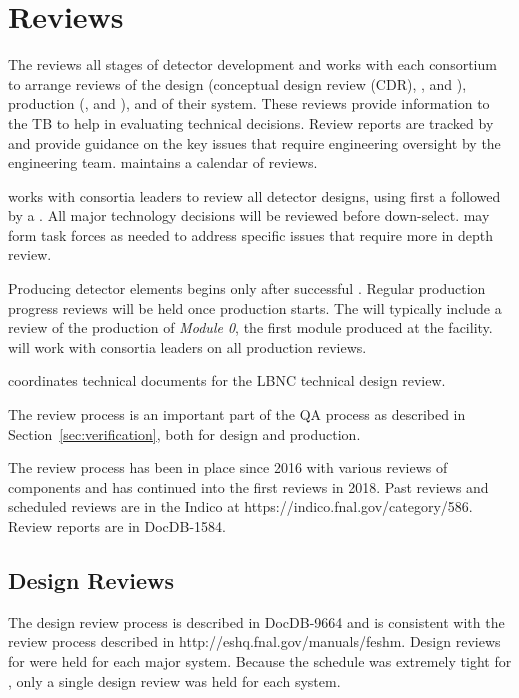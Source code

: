 \chapter{Reviews}
\label{vl:tc-review}

The  reviews all stages of detector
development and works with each consortium to arrange reviews of the
design (conceptual design review (CDR),  , and ),
production (, and ), and  of their
system.  These reviews provide information to the TB  to help in evaluating technical
decisions.  Review reports are tracked by  and provide
guidance on the key issues that require engineering oversight by
the  engineering team.  maintains a calendar
of  reviews.

 works with consortia leaders to review all detector designs,
using first a  followed by a .  All
major technology decisions will be reviewed before down-select.  
may form task forces as needed to address specific issues that require more
in depth review.


Producing detector elements begins only after
successful . Regular production progress
reviews will be held once production starts. The 
will typically include a review of the production of \textit{Module 0}, the
first module produced at the facility.  will work with
consortia leaders on all production reviews.

 coordinates technical documents for the LBNC
technical design review.

The review process is an important part of the  QA process
as described in Section~\ref{sec:verification}, both for
design and production.

The review process has been in place since 2016 with various reviews
of  components and has continued into the first 
reviews in 2018. Past reviews and scheduled reviews are in the
 Indico at https://indico.fnal.gov/category/586.
Review reports are in DocDB-1584.

\section{Design Reviews}

The  design review process is described in DocDB-9664
and is consistent with the \fnal review process described in
http://eshq.fnal.gov/manuals/feshm. Design reviews for  were held for each
major system. Because the schedule was extremely tight for , only a single design review
was held for each system.

